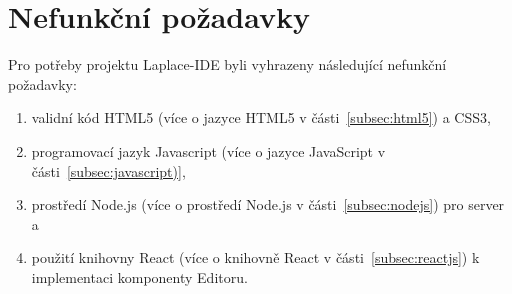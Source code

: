 \section{Nefunkční požadavky}\label{sec:nefuncniPozadavky}

Pro potřeby projektu Laplace-IDE byli vyhrazeny následující nefunkční požadavky:
\begin{enumerate}[label=N\arabic*.]
    \item validní kód HTML5 (více o jazyce HTML5 v části~\ref{subsec:html5}) a \gls{CSS3},
    \item programovací jazyk Javascript (více o jazyce JavaScript v části~\ref{subsec:javascript)},
    \item prostředí Node.js (více o prostředí Node.js v části~\ref{subsec:nodejs}) pro server a
    \item použití knihovny React (více o knihovně React v části~\ref{subsec:reactjs}) k implementaci komponenty Editoru.
\end{enumerate}
